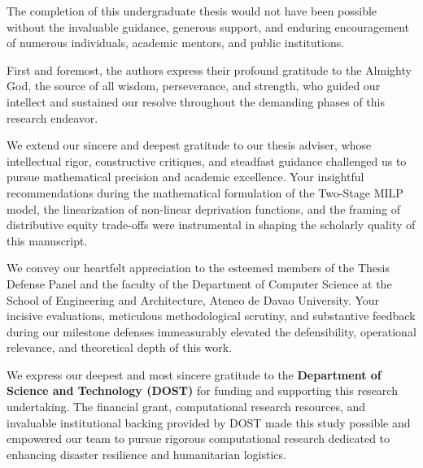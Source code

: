 The completion of this undergraduate thesis would not have been possible without the invaluable guidance, generous support, and enduring encouragement of numerous individuals, academic mentors, and public institutions.

First and foremost, the authors express their profound gratitude to the Almighty God, the source of all wisdom, perseverance, and strength, who guided our intellect and sustained our resolve throughout the demanding phases of this research endeavor.

We extend our sincere and deepest gratitude to our thesis adviser, whose intellectual rigor, constructive critiques, and steadfast guidance challenged us to pursue mathematical precision and academic excellence. Your insightful recommendations during the mathematical formulation of the Two-Stage MILP model, the linearization of non-linear deprivation functions, and the framing of distributive equity trade-offs were instrumental in shaping the scholarly quality of this manuscript.

We convey our heartfelt appreciation to the esteemed members of the Thesis Defense Panel and the faculty of the Department of Computer Science at the School of Engineering and Architecture, Ateneo de Davao University. Your incisive evaluations, meticulous methodological scrutiny, and substantive feedback during our milestone defenses immeasurably elevated the defensibility, operational relevance, and theoretical depth of this work.

We express our deepest and most sincere gratitude to the \textbf{Department of Science and Technology (DOST)} for funding and supporting this research undertaking. The financial grant, computational research resources, and invaluable institutional backing provided by DOST made this study possible and empowered our team to pursue rigorous computational research dedicated to enhancing disaster resilience and humanitarian logistics.

